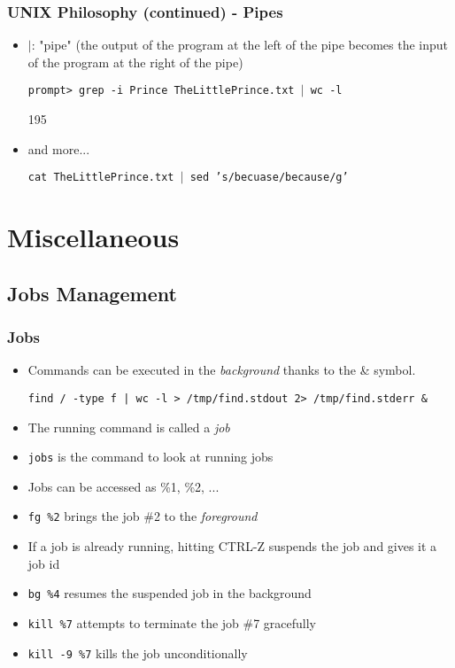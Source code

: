 \documentclass[utf8x,10pt]{beamer}
\begin{document}
\begin{frame}
  \frametitle{UNIX Philosophy (continued) - Pipes}

  \begin{itemize}
  \item \texttt{$|$}: "pipe" (the output of the program at the left of the pipe
    becomes the input of the program at the right of the pipe)

    \texttt{prompt> grep -i Prince TheLittlePrince.txt $|$ wc -l}

    195
    
  \item and more... 

    \texttt{cat TheLittlePrince.txt $|$ sed 's/becuase/because/g'}

  \end{itemize}
\end{frame}

\section{Miscellaneous}
\subsection{Jobs Management}
\begin{frame}
  \frametitle{Jobs}

  \begin{itemize}
  \item Commands can be executed in the \emph{background} thanks to
    the \& symbol.

    \texttt{find / -type f | wc -l > /tmp/find.stdout 2> /tmp/find.stderr \&}

  \item The running command is called a \emph{job}
  \item \texttt{jobs} is the command to look at running jobs
  \item Jobs can be accessed as \%1, \%2, ...
  \item \texttt{fg \%2} brings the job \#2 to the \emph{foreground}
  \item If a job is already running, hitting CTRL-Z suspends the job
    and gives it a job id
  \item \texttt{bg \%4} resumes the suspended job in the background
  \item \texttt{kill \%7} attempts to terminate the job \#7 gracefully
  \item \texttt{kill -9 \%7} kills the job unconditionally
  \end{itemize}
\end{frame}
\end{document}
